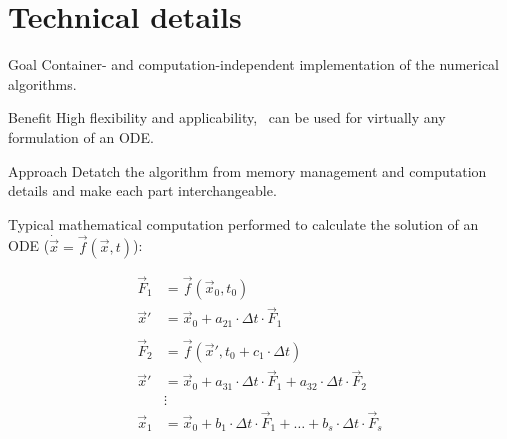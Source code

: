 \section{Technical details}


\begin{frame}
  \tableofcontents[currentsection] 
\end{frame}

\begin{frame}

\begin{block}{Goal}
 Container- and computation-independent implementation of the numerical algorithms.  
\end{block}

\begin{block}{Benefit}
 High flexibility and applicability, \odeint\ can be used for virtually any formulation of an ODE.
\end{block}
 
\begin{block}{Approach}
 Detatch the algorithm from memory management and computation details and make each part interchangeable.
\end{block}

\end{frame}

\begin{frame}

 Typical mathematical computation performed to calculate the solution of an ODE ($\dot{\vec x} = \vec f(\vec x , t)$):

\begin{align*}
 \vec F_1 &= \vec f( \vec x_0 , t_0 ) \\
 \vec x' &= \vec x_0 + a_{21} \cdot \Delta t \cdot \vec F_1 \\ \\
 \vec F_2 &= \vec f( \vec x' , t_0 + c_1\cdot\Delta t ) \\
 \vec x' &= \vec x_0 + a_{31} \cdot \Delta t \cdot \vec F_1 + a_{32} \cdot \Delta t \cdot \vec F_2 \\
         &\vdots \\
 \vec x_1 &= \vec x_0 + b_1\cdot \Delta t \cdot \vec F_1 + \dots + b_s\cdot \Delta t \cdot \vec F_s
\end{align*} 

\end{frame}

